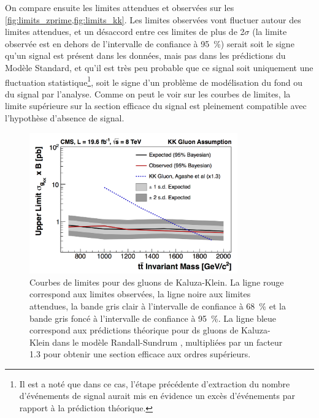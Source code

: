 On compare ensuite les limites attendues et observées sur les \cref{fig:limits_zprime,fig:limits_kk}. Les limites observées vont fluctuer autour des limites attendues, et un désaccord entre ces limites de plus de 2$\sigma$ (la limite observée est en dehors de l'intervalle de confiance à \SI{95}{\%}) serait soit le signe qu'un signal est présent dans les données, mais pas dans les prédictions du Modèle Standard, et qu'il est très peu probable que ce signal soit uniquement une fluctuation statistique\footnote{Il est a noté que dans ce cas, l'étape précédente d'extraction du nombre d'événements de signal aurait mis en évidence un excès d'événements par rapport à la prédiction théorique.}, soit le signe d'un problème de modélisation du fond ou du signal par l'analyse. Comme on peut le voir sur les courbes de limites, la limite supérieure sur la section efficace du signal est pleinement compatible avec l'hypothèse d'absence de signal.

\begin{figure}[tbp] \centering
    \includegraphics[width=0.8\textwidth]{chapitre7/figs/low-mass-limits-kk.png}
    \caption{Courbes de limites pour des gluons de Kaluza-Klein. La ligne rouge correspond aux limites observées, la ligne noire aux limites attendues, la bande gris clair à l'intervalle de confiance à \SI{68}{\percent} et la bande gris foncé à l'intervalle de confiance à \SI{95}{\%}. La ligne bleue correspond aux prédictions théorique pour ds gluons de Kaluza-Klein dans le modèle Randall-Sundrum \citep{Agashe:2006hk}, multipliées par un facteur \num{1.3} pour obtenir une section efficace aux ordres supérieurs.}
    \label{fig:limits_kk}
\end{figure}

\medskip

